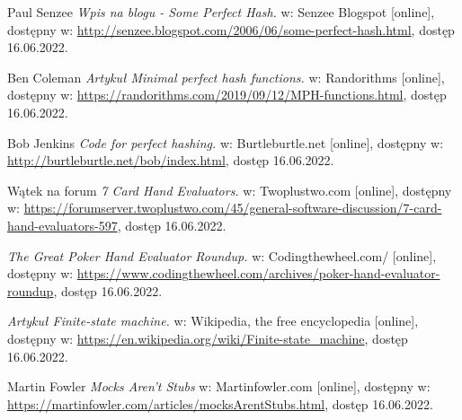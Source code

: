 \documentclass[shortabstract, inz]{iithesis}
\begin{document}
\begin{thebibliography}{1}
Paul Senzee
\textit{Wpis na blogu - Some Perfect Hash.} 
w: Senzee Blogspot [online], dostępny w:
\url{http://senzee.blogspot.com/2006/06/some-perfect-hash.html},
dostęp 16.06.2022.

Ben Coleman
\textit{Artykuł Minimal perfect hash functions.} 
w: Randorithms [online], dostępny w:
\url{https://randorithms.com/2019/09/12/MPH-functions.html},
dostęp 16.06.2022.

Bob Jenkins
\textit{Code for perfect hashing.} 
w: Burtleburtle.net [online], dostępny w:
\url{http://burtleburtle.net/bob/index.html},
dostęp 16.06.2022.

Wątek na forum 
\textit{7 Card Hand Evaluators.} 
w: Twoplustwo.com [online], dostępny w:
\url{https://forumserver.twoplustwo.com/45/general-software-discussion/7-card-hand-evaluators-597},
dostęp 16.06.2022.

\textit{The Great Poker Hand Evaluator Roundup.} 
w: Codingthewheel.com/ [online], dostępny w:
\url{https://www.codingthewheel.com/archives/poker-hand-evaluator-roundup},
dostęp 16.06.2022.

\textit{Artykuł Finite-state machine.} 
w: Wikipedia, the free encyclopedia [online], dostępny w:
\url{https://en.wikipedia.org/wiki/Finite-state_machine},
dostęp 16.06.2022.

Martin Fowler
\textit{Mocks Aren't Stubs} 
w: Martinfowler.com [online], dostępny w:
\url{https://martinfowler.com/articles/mocksArentStubs.html},
dostęp 16.06.2022.

\end{thebibliography}
\end{document}
